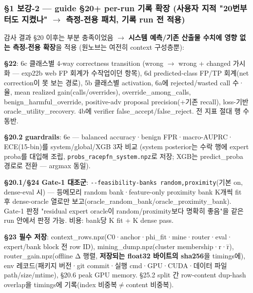\subsubsection{§1 보강-2 — guide §20+\allowbreak{} per-run 기록 확장 (사용자 지적 "20번부터도 지켰나"  \ensuremath{\rightarrow}  측정-전용 패치, 기록 run 전 적용)}
감사 결과 §20 이후는 부분 충족이었음  \ensuremath{\rightarrow}  \textbf{시스템 예측/\allowbreak{}기존 산출물 수치에 영향 없는 측정-전용 확장}을 적용 (원노브는 여전히 context 구성층뿐):

\par\noindent \textbullet\enspace \textbf{§22}: 6c 클래스별 4-way correctness transition (wrong \ensuremath{\rightarrow} wrong +\allowbreak{} changed 가시화 — exp22b web FP 회계가 수작업이던 항목), 6d predicted-class FP/\allowbreak{}TP 회계(net correction이 못 보는 경로), 5b 클래스별 activation, 6a에 rejected/\allowbreak{}wasted call 수·율, mean realized gain(calls/\allowbreak{}overrides), override\_\allowbreak{}among\_\allowbreak{}calls, benign\_\allowbreak{}harmful\_\allowbreak{}override, positive-adv proposal precision(+\allowbreak{}기존 recall), loss-기반 oracle\_\allowbreak{}utility\_\allowbreak{}recovery. 4b에 verifier false\_\allowbreak{}accept/\allowbreak{}false\_\allowbreak{}reject. 전 지표 절대 행 수 동반.


\par\noindent \textbullet\enspace \textbf{§20.2 guardrails}: 6e — balanced accuracy·benign FPR·macro-AUPRC· ECE(15-bin)를 system/\allowbreak{}global/\allowbreak{}XGB 3자 비교 (system posterior는 수락 행에 expert proba를 대입해 조립, \texttt{probs\_\allowbreak{}\allowbreak{}ra\allowbreak{}cepfn\_\allowbreak{}\allowbreak{}sy\allowbreak{}stem.\allowbreak{}npz\allowbreak{}}로 저장; XGB는 predict\_\allowbreak{}proba 경로로 전환 — argmax 동일).


\par\noindent \textbullet\enspace \textbf{§20.1/\allowbreak{}§24 Gate-1 대조군}: \texttt{-\allowbreak{}-\allowbreak{}feasib\allowbreak{}ility-\allowbreak{}ba\allowbreak{}nks rand\allowbreak{}om,\allowbreak{}proxi\allowbreak{}mity}(기본 on, dense-eval 시) — 등메모리 random bank·feature-only proximity bank K개씩 fit 후 dense-oracle 열로만 보고(oracle\_\allowbreak{}random\_\allowbreak{}bank/\allowbreak{}oracle\_\allowbreak{}proximity\_\allowbreak{}bank). Gate-1 판정 "residual expert oracle이 random/\allowbreak{}proximity보다 명확히 좋음"을 같은 run 안에서 판정 가능. 비용: bank당 K fit +\allowbreak{} K dense pass.


\par\noindent \textbullet\enspace \textbf{§23 필수 저장}: context\_\allowbreak{}rows.npz(C0·anchor·phi\_\allowbreak{}fit·mine·router·eval· expert/\allowbreak{}bank block 전 row ID), mining\_\allowbreak{}dump.npz(cluster membership·r·r̄), router\_\allowbreak{}gain.npz(offline Δ 행렬, \textbf{저장되는 float32 바이트의 sha256}을 timings에), env 레코드(패키지 버전·git commit·실행 cmd·GPU·CUDA·데이터 파일 path/\allowbreak{}size/\allowbreak{}mtime), §20.6 peak GPU memory. §25.2 split 간 row-content dup-hash overlap을 timings에 기록(index 비중복\ensuremath{\neq}content 비중복).


